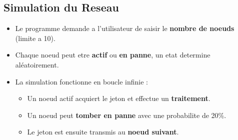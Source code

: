 \documentclass{rapportINPTCLOUD}
\begin{document}
\subsection{Simulation du Reseau}
\begin{itemize}
    \item Le programme demande a l’utilisateur de saisir le \textbf{nombre de noeuds} (limite a 10).
    \item Chaque noeud peut etre \textbf{actif} ou \textbf{en panne}, un etat determine aléatoirement.
    \item La simulation fonctionne en boucle infinie :
    \begin{itemize}
        \item Un noeud actif acquiert le jeton et effectue un \textbf{traitement}.
        \item Un noeud peut \textbf{tomber en panne} avec une probabilite de 20\%.
        \item Le jeton est ensuite transmis au \textbf{noeud suivant}.
    \end{itemize}
\end{itemize}
\end{document}
